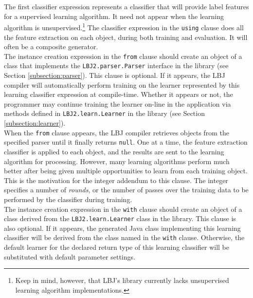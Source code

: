 \noindent
The first classifier expression represents a classifier that will provide
label features for a supervised learning algorithm.  It need not appear when
the learning algorithm is unsupervised.\footnote{Keep in mind, however, that
LBJ's library currently lacks unsupervised learning algorithm
implementations.}  The classifier expression in the {\tt using} clause does
all the feature extraction on each object, during both training and
evaluation.  It will often be a composite generator. \\

The instance creation expression in the {\tt from} clause should create an
object of a class that implements the {\tt LBJ2.parser.Parser} interface in
the library (see Section \ref{subsection:parser}).  This clause is optional.
If it appears, the LBJ compiler will automatically perform training on the
learner represented by this learning classifier expression at compile-time.
Whether it appears or not, the programmer may continue training the learner
on-line in the application via methods defined in {\tt LBJ2.learn.Learner} in
the library (see Section \ref{subsection:learner}). \\

When the {\tt from} clause appears, the LBJ compiler retrieves objects from
the specified parser until it finally returns {\tt null}.  One at a time, the
feature extraction classifier is applied to each object, and the results are
sent to the learning algorithm for processing.  However, many learning
algorithms perform much better after being given multiple opportunities to
learn from each training object.  This is the motivation for the integer
addendum to this clause.  The integer specifies a number of \emph{rounds}, or
the number of passes over the training data to be performed by the classifier
during training.  \\

The instance creation expression in the {\tt with} clause should create an
object of a class derived from the {\tt LBJ2.learn.Learner} class in the
library.  This clause is also optional.  If it appears, the generated Java
class implementing this learning classifier will be derived from the class
named in the {\tt with} clause.  Otherwise, the default learner for the
declared return type of this learning classifier will be substituted with
default parameter settings. \\

